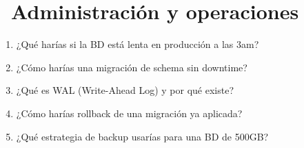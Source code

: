 \section[\emj{🎤} Administración y operaciones]{~Administración y operaciones}

\begin{entrevistabox}
\begin{enumerate}
  \item ¿Qué harías si la BD está lenta en producción a las 3am?
  \item ¿Cómo harías una migración de schema sin downtime?
  \item ¿Qué es WAL (Write-Ahead Log) y por qué existe?
  \item ¿Cómo harías rollback de una migración ya aplicada?
  \item ¿Qué estrategia de backup usarías para una BD de 500GB?
\end{enumerate}
\end{entrevistabox}
